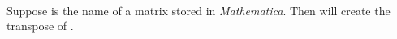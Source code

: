 \contributedby{\robertbeezer}\\
Suppose  is the name of a matrix stored in {\sl Mathematica}.  
Then  will create the transpose of . 